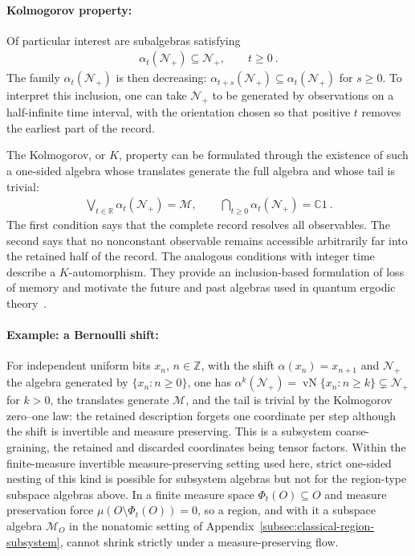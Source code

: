 \documentclass[a4paper,11pt]{article}
\theoremstyle{definition}
\newcommand{\mN}{\mathcal{N}}
\newcommand{\mM}{\mathcal{M}}
\begin{document}


\paragraph{Kolmogorov property:}
Of particular interest are subalgebras satisfying
\begin{align}\label{eq:classical-one-sided-inclusion}
    \alpha_t(\mN_+)\subseteq\mN_+,\qquad t\geq0\ .
\end{align}
The family $\alpha_t(\mN_+)$ is then decreasing: $\alpha_{t+s}(\mN_+)\subseteq\alpha_t(\mN_+)$ for $s\geq0$. To interpret this inclusion, one can take $\mN_+$ to be generated by observations on a half-infinite time interval, with the orientation chosen so that positive $t$ removes the earliest part of the record.

The Kolmogorov, or $K$, property can be formulated through the existence of such a one-sided algebra whose translates generate the full algebra and whose tail is trivial:
\begin{align}\label{eq:classical-K-algebra}
    \bigvee_{t\in\mathbb R}\alpha_t(\mN_+)=\mM,
    \qquad
    \bigcap_{t\geq0}\alpha_t(\mN_+)=\mathbb C1\ .
\end{align}
The first condition says that the complete record resolves all observables. The second says that no nonconstant observable remains accessible arbitrarily far into the retained half of the record. The analogous conditions with integer time describe a $K$-automorphism. They provide an inclusion-based formulation of loss of memory and motivate the future and past algebras used in quantum ergodic theory~\cite{ouseph2024local}.

\paragraph{Example: a Bernoulli shift:}
For independent uniform bits $x_n$, $n\in\mathbb Z$, with the shift $\alpha(x_n)=x_{n+1}$ and $\mN_+$ the algebra generated by $\{x_n:n\geq0\}$, one has $\alpha^k(\mN_+)=\operatorname{vN}\{x_n:n\geq k\}\subsetneq\mN_+$ for $k>0$, the translates generate $\mM$, and the tail is trivial by the Kolmogorov zero--one law: the retained description forgets one coordinate per step although the shift is invertible and measure preserving. This is a subsystem coarse-graining, the retained and discarded coordinates being tensor factors. Within the finite-measure invertible measure-preserving setting used here, strict one-sided nesting of this kind is possible for subsystem algebras but not for the region-type subspace algebras above. In a finite measure space $\Phi_t(O)\subseteq O$ and measure preservation force $\mu(O\setminus\Phi_t(O))=0$, so a region, and with it a subspace algebra $\mM_O$ in the nonatomic setting of Appendix~\ref{subsec:classical-region-subsystem}, cannot shrink strictly under a measure-preserving flow.
\end{document}
